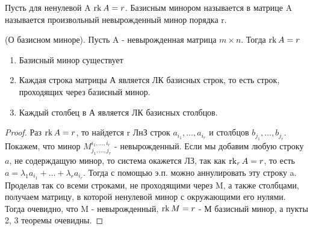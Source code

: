 \begin{definition}
	Пусть для ненулевой A \(\operatorname{rk} A = r\). Базисным минором называется в матрице A называется произвольный невырожденный минор порядка r.
\end{definition}
\begin{theorem}
	(О базисном миноре). Пусть A - невырожденная матрица \(m\times n\). Тогда \(\operatorname{rk} A = r\)
	\begin{enumerate}
		\item Базисный минор существует
		\item Каждая строка матрицы А является ЛК базисных строк, то есть строк, проходящих через базисный минор.
		\item Каждый столбец в А является ЛК базисных столбцов.
	\end{enumerate}
\end{theorem}
\begin{proof}
	Раз \(\operatorname{rk} A = r\), то найдется r ЛнЗ строк \(a_{i_1}, \ldots, a_{i_r}\) и столбцов \(b_{j_1}, \ldots, b_{j_r}\). Покажем, что минор \(M^{i_1, \ldots, i_r}_{j_1,\ldots, j_r}\) - невырожденный. Если мы добавим любую строку \(a\), не содерждащую минор, то система окажется ЛЗ, так как \(\operatorname{rk}_r A = r\), то есть \(a = \lambda_1a_{i_1}+\ldots + \lambda_r a_{i_r} \). Тогда с помощью э.п. можно аннулировать эту строку a. Проделав так со всеми строками, не проходящими через M, а также столбцами, получаем матрицу, в которой ненулевой минор с окружающими его нулями. Тогда очевидно, что M - невырожденный, \(\operatorname{rk} M = r\) - М базисный минор, а пукты 2, 3 теоремы очевидны. 
\end{proof}